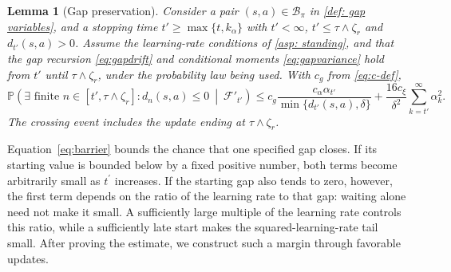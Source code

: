 \documentclass[twoside,11pt]{article}
\newtheorem{lemma}[lemma]{Lemma}
\DeclareRobustCommand{\reviewbarstart}{%
  \ifhmode %
    \vadjust{\vbox to 0pt{%
      \vskip-\ht\strutbox %
      \vskip-\dp\strutbox %
      \cbstart[\changebarwidth] %
      \vss %
    }}%
  \else %
    \cbstart[\changebarwidth]%
  \fi %
} %
\providecommand{\DIFadd}[1]{#1} %
\providecommand{\DIFaddbegin}{\reviewbarstart} %
\providecommand{\DIFaddend}{\protect\cbend} %
\def\DIFadd#1{#1}%
\def\DIFaddbegin{}%
\def\DIFaddend{}%
\begin{document}
 \DIFaddbegin \begin{lemma}[Gap preservation]
\label{lem:barrier}
\DIFadd{Consider a pair $(s,a)\in\mathcal B_\pi$ }\DIFaddend in \autoref{def: gap variables}, and  \DIFaddbegin \DIFadd{a stopping time $t'\ge\max\{t,k_\alpha\}$ with $t'<\infty$}\DIFaddend ,  \DIFaddbegin \DIFadd{$t'\le\tau\wedge\zeta_r$ and $d_{t'}(s,a)>0$.
Assume the learning-rate conditions of \autoref{asp: standing}, }\DIFaddend and  \DIFaddbegin \DIFadd{that the gap recursion \eqref{eq:gapdrift} and conditional moments \eqref{eq:gapvariance} hold from $t'$ until $\tau\wedge\zeta_r$, under the probability law being used. With $c_g$ from \eqref{eq:c-def},
}\begin{equation}
\DIFadd{\label{eq:barrier}
\mathbb P\!\left(\exists\text{ finite }n\in[t',\tau\wedge\zeta_r]:d_n(s,a)\le0\ \middle|\ \mathcal F'_{t'}\right)
\le c_g\frac{c_\alpha\alpha_{t'}}{\min\{d_{t'}(s,a),\delta\}}
+\frac{16c_\xi}{\delta^2}\sum_{k=t'}^\infty\alpha_k^2.
}\end{equation}\DIFaddend 
 \DIFaddbegin \DIFadd{The crossing event includes the update ending at $\tau\wedge\zeta_r$.
}\DIFaddend \end{lemma}
\DIFaddbegin \DIFadd{Equation~\eqref{eq:barrier} bounds the chance that one specified gap closes. If its starting value is bounded below by a fixed positive number, both terms become arbitrarily small as $t^{\prime}$ increases. If the starting gap also tends to zero, however, the first term depends on the ratio of the learning rate to that gap: waiting alone need not make it small. A sufficiently large multiple of the learning rate controls this ratio, while a sufficiently late start makes the squared-learning-rate tail small. After proving the estimate, we construct such a margin through favorable updates.
}
\end{document}
